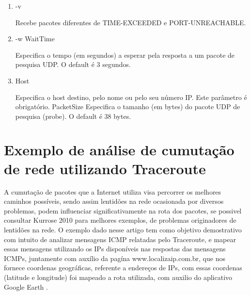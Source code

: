 \documentclass[
	article,			%
	11pt,				%
	oneside,			%
	a4paper,			%
	english,			%
	brazil,				%
	sumario=tradicional
	]{abntex2}
\begin{document}
\begin{enumerate}
	\item -v
	
	Recebe pacotes diferentes de TIME-EXCEEDED e PORT-UNREACHABLE.
	
	\item -w WaitTime 
	
	Especifica o tempo (em segundos) a esperar pela resposta a um pacote de pesquisa UDP. O default é 3 segundos.
	
	
	\item Host      
	
	Especifica o host destino, pelo nome ou pelo seu número IP. Este parâmetro é obrigatório. PacketSize Especifica o tamanho (em bytes)  do pacote UDP de pesquisa (probe). O default é 38 bytes.     
\end{enumerate}                    


\section{Exemplo de análise de cumutação de rede utilizando Traceroute}
A cumutação de pacotes que a Internet utiliza visa percorrer os melhores caminhos possíveis, sendo assim lentid\~oes na rede ocasionada por diversos problemas, podem influenciar significativamente na rota dos pacotes, se possivel consultar Kurrose 2010 para melhores exemplos, de problemas originadores de lentid\~oes na rede. 
O exemplo dado nesse artigo tem como objetivo demostrativo com intuito de analizar mensagens ICMP relatadas pelo Traceroute, e mapear essas mensagens utilizando os IPs disponíveis nas respostas das mensagens ICMPs, juntamente com auxílio da pagína www.localizaip.com.br, que nos fornece coordenas geográficas, referente a endereços de IPs, com essas coordenas (latitude e longitude) foi mapeado a rota utilizada, com auxilio do aplicativo Google Earth . 
\end{document}
